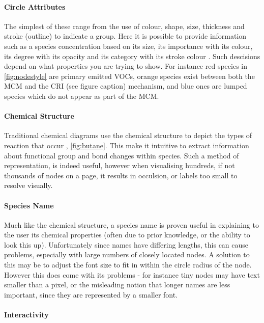 \paragraph*{\color{c4}Circle Attributes}



The simplest of these range from the use of colour, shape, size, thickness and stroke (outline) to indicate a group. Here it is possible to provide information such as a species concentration based on its size, its importance with its colour, its degree with its opacity and its category with its stroke colour \citep{colourb,rightness}. Such descisions depend on what properties you are trying to show. For instance red species in \autoref{fig:nodestyle} are primary emitted VOCs, orange species exist between both the MCM and the CRI (see figure caption) mechanism, and blue ones are lumped species which do not appear as part of the MCM.  


\paragraph*{\color{c1}Chemical Structure}
Traditional chemical diagrams use the chemical structure to depict the types of reaction that occur , \autoref{fig:butane}. This make it intuitive to extract information about functional group and bond changes within species. Such a method of representation, is indeed useful, however when visualising hundreds, if not thousands of nodes on a page, it results in occulsion, or labels too small to resolve visually. 

\paragraph*{\color{c2}Species Name}

Much like the chemical structure, a species name is proven useful in explaining to the user its chemical properties (often due to prior knowledge, or the ability to look this up). Unfortunately since names have differing lengths, this can cause problems, especially with large numbers of closely located nodes. A solution to this may be to adjust the font size to fit in within the circle radius of the node. However this does come with its problems - for instance tiny nodes may have text smaller than a pixel, or the misleading notion that longer names are less important, since they are represented by a smaller font. 


\paragraph*{\color{c3}Interactivity}

